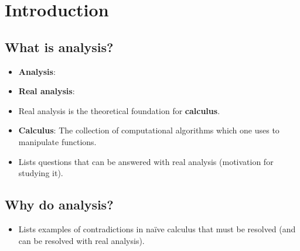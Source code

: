 \documentclass[../main.tex]{subfiles}
\begin{document}
\chapter{Introduction}
\section{What is analysis?}
\begin{itemize}
    \item {}\textbf{Analysis}: 
    \item \textbf{Real analysis}: 
    \item Real analysis is the theoretical foundation for \textbf{calculus}.
    \item \textbf{Calculus}: The collection of computational algorithms which one uses to manipulate functions.
    \item Lists questions that can be answered with real analysis (motivation for studying it).
\end{itemize}



\section{Why do analysis?}
\begin{itemize}
    \item Lists examples of contradictions in na\"{i}ve calculus that must be resolved (and can be resolved with real analysis).
\end{itemize}
\end{document}

